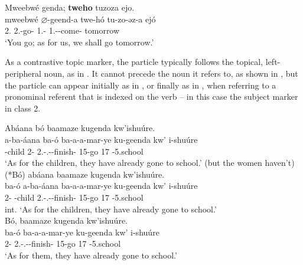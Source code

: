 \documentclass[output=paper]{langscibook}
\begin{document}
\ea
\label{bkm:Ref70288900}
Mweebwé genda; \textbf{tweho} tuzoza ejo.\\
\gll
mweebwé  $\varnothing$-geend-a  twe-hó  tu-zo-əz-a  ejó\\
2\PL.\PRO{}  2\PL.\SM-{}go-\IMP{}  1\PL.\PRO{}-\CM{}  1\PL.\SM-\FUT-{}come-\FV{}  tomorrow\\
\glt
‘You go; as for us, we shall go tomorrow.’\\

\z

As a contrastive topic marker, the particle typically follows the topical, left-peripheral noun, as in . It cannot precede the noun it refers to, as shown in , but the particle can appear initially as in , or finally as in , when referring to a pronominal referent that is indexed on the verb – in this case the subject marker in class 2.

\ea
\ea
\label{bkm:Ref74757572}
Abáana bó baamaze kugenda kw’ishuúre.\\
\gll
a-ba-áana  ba-ó  ba-a-a-mar-ye  ku-geenda  kw’  i-shuúre\\
-{}child  2-\CM{}  2.\SM-\N.\PST-\DJ-{}finish-\PFV{}  15-go  17  \AUG-5.school\\
\glt
‘As for the children, they have already gone to school.’ (but the women haven’t)\\

\ex
\label{bkm:Ref74757617}
(*Bó) abáana baamaze kugenda kw’ishuúre.\\
\gll
ba-ó  a-ba-áana  ba-a-a-mar-ye  ku-geenda  kw’  i-shuúre\\
2-\CM{}  -{}child  2.\SM-\N.\PST-\DJ-{}finish-\PFV{}  15-go  17  \AUG-5.school\\
\glt
int. ‘As for the children, they have already gone to school.’\\

\ex
\label{bkm:Ref74757916}
Bó, baamaze kugenda kw’ishuúre.\\
\gll
ba-ó  ba-a-a-mar-ye  ku-geenda  kw’  i-shuúre\\
2-\CM{}  2.\SM-\N.\PST-\DJ-{}finish-\PFV{}  15-go  17  \AUG-5.school\\
\glt
‘As for them, they have already gone to school.’\\
\end{document}
